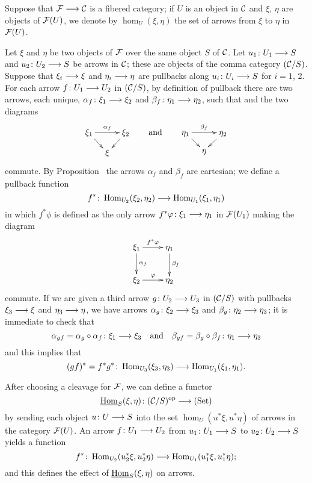 \begin{3   FIBERED CATEGORIES}
\begin{3.7 The functors of arrows of a fibcat}
Suppose that $\cF \arr \cC$ is a fibered category; if $U$ is an object in $\mathcal{C}$ and $\xi$, $\eta$ are objects of $\mathcal{F}(U)$, we denote by $\hom_U(\xi, \eta)$ the set of arrows from $\xi$ to $\eta$ in $\mathcal{F}(U)$.

Let $\xi$ and $\eta$ be two objects of $\mathcal{F}$ over the same object $S$ of $\mathcal{C}$. Let $u_1 \colon U_1 \arr S$  and $u_2 \colon U_2 \arr S$ be arrows in $\mathcal{C}$; these are objects of the comma category $(\mathcal{C}/S)$. Suppose that $\xi_i \arr \xi$ and $\eta_i \arr \eta$ are pullbacks along $u_i \colon U_i \arr S$ for $i=1$, 2. For each arrow $f \colon U_1 \arr U_2$ in $(\mathcal{C}/S)$, by definition of pullback there are two arrows, each unique,  $\alpha_f \colon \xi_1 \arr \xi_2$ and $\beta_f \colon \eta_1 \arr \eta_2$, such that and the two diagrams
   \[
   \xymatrix@-15pt{\xi_1\ar[rr]^{\alpha_f}
   \ar[rd]
   && \xi_2 \ar[ld]\\ &\xi &}\qquad
   \text{and}\qquad
   \xymatrix@-15pt{\eta_1 \ar[rr]^{\beta_f}\ar[rd]
   && \eta_2\ar[ld]\\ &\eta &}
   \]
commute. By Proposition~ the arrows $\alpha_f$ and $\beta_f$ are cartesian; we define a pullback function
   \[
   f^* \colon \hom_{U_2}(\xi_2, \eta_2) \arr
   \hom_{U_1}(\xi_1, \eta_1)
   \]
in which $f^* \phi$ is defined as the only arrow $f^* \phi \colon \xi_1 \arr \eta_1$ in $\mathcal{F}(U_1)$ making the diagram
   \[
   \xymatrix{
   \xi_1\ar[r]^{f^*\phi}\ar[d]^{\alpha_f}
   & \eta_1\ar[d]^{\beta_f}\\
   \xi_2\ar[r]^{\phi} & \eta_2
   }
   \]
commute. If we are given a third arrow $g \colon U_2 \arr U_3$ in $(\mathcal{C}/S)$ with pullbacks $\xi_3\arr \xi$ and $\eta_3 \arr \eta$, we have arrows $\alpha_g \colon \xi_2 \arr \xi_3$ and $\beta_g \colon \eta_2 \arr \eta_3$; it is immediate to check that
   \[
   \alpha_{gf} = \alpha_g \circ \alpha_f
   \colon \xi_1 \arr \xi_3\quad
   \text{and}\quad
   \beta_{gf} = \beta_g \circ \beta_f
   \colon \eta_1 \arr \eta_3
   \]
and this implies that
   \[
   (gf)^* = f^* g^* \colon \hom_{U_3}(\xi_3, \eta_3)
   \arr \hom_{U_1}(\xi_1, \eta_1).
   \]

After choosing a cleavage for $\mathcal{F}$, we can define a functor
   \[
   \underhom_S(\xi, \eta) \colon (\cC/S)\op \arr
   \catset
   \]
by sending each object $u \colon U \arr S$ into the set $\hom_U(u^* \xi, u^* \eta)$ of arrows in the category $\mathcal{F}(U)$. An arrow $f \colon U_1 \arr U_2$ from $u_1 \colon U_1 \arr S$ to $u_2 \colon U_2 \arr S$ yields a function
   \[
   f^* \colon \hom_{U_2}(u^*_2\xi, u^*_2\eta)
   \arr \hom_{U_1}(u^*_1\xi, u^*_1\eta);
   \]
and this defines the effect of $\mathop{\underline{\mathrm{Hom}}}\nolimits_S(\xi, \eta)$ on arrows.


\end{3.7 The functors of arrows of a fibcat}
\end{3   FIBERED CATEGORIES}
